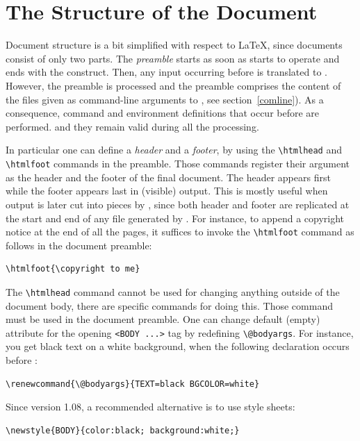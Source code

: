 \section{The Structure of the Document}\label{structure}
Document structure is a bit simplified with respect to \LaTeX{}, since
documents consist of only two parts.
The \emph{preamble} starts as soon as \hevea{} starts to operate and
ends with the \verb++ construct.
Then, any input occurring before
\verb++ is translated to \html{}.
However, the preamble is processed
and the preamble comprises the content of the files given as command-line
arguments to \hevea{}, see section~\ref{comline}).
As a consequence, command and environment  definitions that
occur  before \verb++ are performed.
and they remain
valid during all the processing.

In particular one can define a \emph{header} and a \emph{footer}, by using the
\verb+\htmlhead+ and \verb+\htmlfoot+ commands in the preamble.
Those commands register their argument as the header and the footer of
the final \html{} document. The header appears first while the footer
appears last in (visible) \html{} output.
This is mostly useful when \hevea{} output is later cut into pieces by
\hacha{}, since both header and footer are replicated
at the start and end of any file generated by \hacha.
For instance, to append a copyright notice at the end of all the \html{}
pages, it suffices to invoke the \verb+\htmlfoot+ command as follows
in the document preamble:
\begin{verbatim}
\htmlfoot{\copyright to me}
\end{verbatim}


\label{metadef}
The \verb+\htmlhead+ command cannot be used for changing anything outside of
the \html{} document body, there are specific commands for doing this.
Those command must be used in the document preamble.
One can
change \hevea{} default (empty) attribute for
the opening \verb+<BODY ...>+ tag by redefining
\verb+\@bodyargs+.
For instance, you get black text on a white background, when the
following declaration occurs before \verb++:
\begin{verbatim}
\renewcommand{\@bodyargs}{TEXT=black BGCOLOR=white}
\end{verbatim}
Since version 1.08, a recommended alternative is to use style sheets:
\begin{verbatim}
\newstyle{BODY}{color:black; background:white;}
\end{verbatim}



